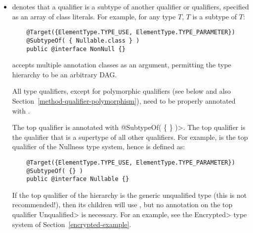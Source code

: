 \begin{itemize}

\item {} denotes that a qualifier is a subtype of
  another qualifier or qualifiers, specified as an array of class
  literals.  For example, for any type $T$,
   $T$ is a subtype of  $T$:

  \begin{Verbatim}
    @Target({ElementType.TYPE_USE, ElementType.TYPE_PARAMETER})
    @SubtypeOf( { Nullable.class } )
    public @interface NonNull {}
  \end{Verbatim}



   accepts multiple annotation classes as an argument,
  permitting the type hierarchy to be an arbitrary DAG\@.


  All type qualifiers, except for polymorphic qualifiers (see below and
  also Section~\ref{method-qualifier-polymorphism}), need to be
  properly annotated with .

  The top qualifier is annotated with
  \<@SubtypeOf( \{ \} )>.  The top qualifier is the qualifier that is
  a supertype of all other qualifiers.  For example, 
  is the top qualifier of the Nullness type system, hence is defined as:

  \begin{Verbatim}
    @Target({ElementType.TYPE_USE, ElementType.TYPE_PARAMETER})
    @SubtypeOf( {} )
    public @interface Nullable {}
  \end{Verbatim}

  \begin{sloppypar}
  If the top qualifier of the hierarchy is the generic unqualified type
  (this is not recommended!), then its children
  will use , but no
   annotation on the top qualifier \<Unqualified> is
  necessary.  For an example, see the
  \<Encrypted> type system of Section~\ref{encrypted-example}.
  \end{sloppypar}


\end{itemize}
